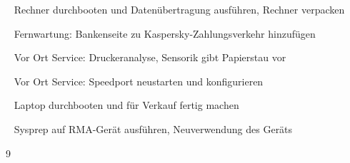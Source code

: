 {{	\textbullet~ Rechner durchbooten und Datenübertragung ausführen, Rechner verpacken\par
	\textbullet~ Fernwartung: Bankenseite zu Kaspersky-Zahlungsverkehr hinzufügen\par
	\textbullet~ Vor Ort Service: Druckeranalyse, Sensorik gibt Papierstau vor\par
	\textbullet~ Vor Ort Service: Speedport neustarten und konfigurieren\par
	\textbullet~ Laptop durchbooten und für Verkauf fertig machen\par
	\textbullet~ Sysprep auf RMA-Gerät ausführen, Neuverwendung des Geräts
	}{}{9}
}{}
\Unterschrift
\newpage
